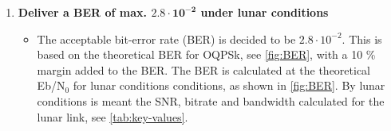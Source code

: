 \begin{enumerate}[label=\textbf{\arabic*})]
\item \textbf{Deliver a BER of max. $\mathbf{2.8\cdot10^{-2}}$ under lunar conditions}
\begin{itemize}
\item[] The acceptable bit-error rate (BER) is decided to be $2.8\cdot10^{-2}$. This is based on the theoretical BER for OQPSk, see \autoref{fig:BER}, with a 10 \% margin added to the BER. The BER is calculated at the theoretical Eb/N$_0$ for lunar conditions conditions, as shown in \autoref{fig:BER}. By lunar conditions is meant the SNR, bitrate and bandwidth calculated for the lunar link, see \autoref{tab:key-values}.
\end{itemize}

\end{enumerate}










